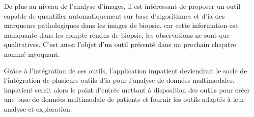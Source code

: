 De plus au niveau de l'analyse d'images, il est intéressant de proposer un outil capable de quantifier automatiquement sur base d'algorithmes et d'\gls{ia} des marqueurs pathologiques dans les images de biopsie, car cette information est manquante dans les compte-rendus de biopsie, les observations ne sont que qualitatives. C'est aussi l'objet d'un outil présenté dans un prochain chapitre nommé \gls{myoquant}.

Grâce à l'intégration de ces outils, l'application \gls{impatient} deviendrait le socle de l'intégration de plusieurs outils d'\gls{ia} pour l'analyse de données multimodales. \gls{impatient} serait alors le point d'entrée mettant à disposition des outils pour créer une base de données multimodale de patients et fournir les outils adaptés à leur analyse et exploration.